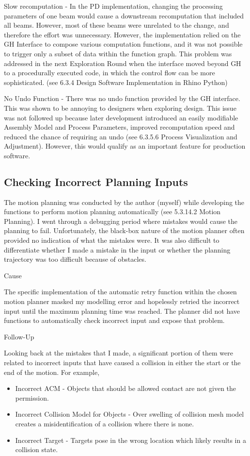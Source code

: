Slow recomputation - In the PD implementation, changing the processing parameters of one beam would cause a downstream recomputation that included all beams. However, most of these beams were unrelated to the change, and therefore the effort was unnecessary. However, the implementation relied on the GH Interface to compose various computation functions, and it was not possible to trigger only a subset of data within the function graph. This problem was addressed in the next Exploration Round when the interface moved beyond GH to a procedurally executed code, in which the control flow can be more sophisticated. (see 6.3.4 Design Software Implementation in Rhino Python)

No Undo Function - There was no undo function provided by the GH interface. This was shown to be annoying to designers when exploring design. This issue was not followed up because later development introduced an easily modifiable Assembly Model and Process Parameters, improved recomputation speed and reduced the chance of requiring an undo (see 6.3.5.6 Process Visualization and Adjustment). However, this would qualify as an important feature for production software. 

\subsection{Checking Incorrect Planning Inputs}
\label{subsection:exploration_2_checking_incorrect_planning_inputs}

The motion planning was conducted by the author (myself) while developing the functions to perform motion planning automatically (see 5.3.14.2 Motion Planning). I went through a debugging period where mistakes would cause the planning to fail. Unfortunately, the black-box nature of the motion planner often provided no indication of what the mistakes were. It was also difficult to differentiate whether I made a mistake in the input or whether the planning trajectory was too difficult because of obstacles. 

Cause

The specific implementation of the automatic retry function within the chosen motion planner masked my modelling error and hopelessly retried the incorrect input until the maximum planning time was reached. The planner did not have functions to automatically check incorrect input and expose that problem.

Follow-Up

Looking back at the mistakes that I made, a significant portion of them were related to incorrect inputs that have caused a collision in either the start or the end of the motion. For example, 
\begin{itemize}
    \item Incorrect ACM - Objects that should be allowed contact are not given the permission.
    \item Incorrect Collision Model for Objects - Over swelling of collision mesh model creates a misidentification of a collision where there is none.
    \item Incorrect Target - Targets pose in the wrong location which likely results in a collision state.
\end{itemize}

